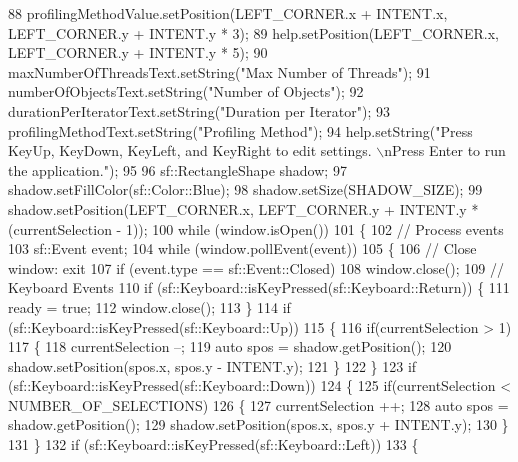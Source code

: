 \begin{DoxyCodeInclude}
88     profilingMethodValue.setPosition(LEFT\_CORNER.x + INTENT.x, LEFT\_CORNER.y + INTENT.y * 3);
89     help.setPosition(LEFT\_CORNER.x, LEFT\_CORNER.y + INTENT.y * 5);
90     maxNumberOfThreadsText.setString(\textcolor{stringliteral}{"Max Number of Threads"});
91     numberOfObjectsText.setString(\textcolor{stringliteral}{"Number of Objects"});
92     durationPerIteratorText.setString(\textcolor{stringliteral}{"Duration per Iterator"});
93     profilingMethodText.setString(\textcolor{stringliteral}{"Profiling Method"});
94     help.setString(\textcolor{stringliteral}{"Press KeyUp, KeyDown, KeyLeft, and KeyRight to edit settings. \(\backslash\)nPress Enter to run the
       application."});
95     
96     sf::RectangleShape shadow;
97     shadow.setFillColor(sf::Color::Blue);
98     shadow.setSize(SHADOW\_SIZE);
99     shadow.setPosition(LEFT\_CORNER.x, LEFT\_CORNER.y + INTENT.y * (currentSelection - 1));
100     \textcolor{keywordflow}{while} (window.isOpen())
101     \{
102         \textcolor{comment}{// Process events}
103         sf::Event event;
104         \textcolor{keywordflow}{while} (window.pollEvent(event))
105         \{
106             \textcolor{comment}{// Close window: exit}
107             \textcolor{keywordflow}{if} (event.type == sf::Event::Closed)
108                 window.close();
109             \textcolor{comment}{// Keyboard Events}
110             \textcolor{keywordflow}{if} (sf::Keyboard::isKeyPressed(sf::Keyboard::Return)) \{
111                 ready = \textcolor{keyword}{true};
112                 window.close();
113             \}
114             \textcolor{keywordflow}{if} (sf::Keyboard::isKeyPressed(sf::Keyboard::Up))
115             \{
116                 \textcolor{keywordflow}{if}(currentSelection > 1)
117                 \{
118                     currentSelection --;
119                     \textcolor{keyword}{auto} spos = shadow.getPosition();
120                     shadow.setPosition(spos.x, spos.y - INTENT.y);
121                 \}
122             \}
123             \textcolor{keywordflow}{if} (sf::Keyboard::isKeyPressed(sf::Keyboard::Down))
124             \{
125                 \textcolor{keywordflow}{if}(currentSelection < NUMBER\_OF\_SELECTIONS)
126                 \{
127                     currentSelection ++;
128                     \textcolor{keyword}{auto} spos = shadow.getPosition();
129                     shadow.setPosition(spos.x, spos.y + INTENT.y);
130                 \}
131             \}
132             \textcolor{keywordflow}{if} (sf::Keyboard::isKeyPressed(sf::Keyboard::Left))
133             \{

\end{DoxyCodeInclude}
